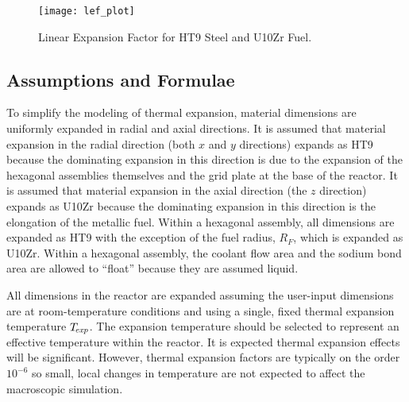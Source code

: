     \begin{figure}
      \centering
      \texttt{[image: lef\_plot]}
      \caption{Linear Expansion Factor for HT9 Steel and U10Zr Fuel.}
      \label{fig:lef_plot}
    \end{figure}
    
  \subsection{Assumptions and Formulae}
  \label{sec:model_details__assumptions_and_formulae}
    To simplify the modeling of thermal expansion, material dimensions are
    uniformly expanded in radial and axial directions. It is assumed that 
    material expansion in the radial direction (both $x$ and $y$ directions) 
    expands as HT9 because the dominating expansion in this direction is due to 
    the expansion of the hexagonal assemblies themselves and the grid plate at
    the base of the reactor. It is assumed that
    material expansion in the axial direction (the $z$ direction) expands as 
    U10Zr because the dominating expansion in this direction is the elongation 
    of the metallic fuel. Within a hexagonal assembly, all dimensions are 
    expanded as HT9 with the exception of the fuel radius, $R_F$, which is 
    expanded as U10Zr. Within a hexagonal assembly, the coolant flow area and 
    the sodium bond area are allowed to ``float'' because they are assumed 
    liquid.
    
    All dimensions in the reactor are expanded assuming the user-input 
    dimensions are at room-temperature conditions and using a single, fixed 
    thermal expansion temperature $T_{\!\mbox{\scriptsize \em exp}}$. The expansion temperature should be 
    selected to represent an effective temperature within the reactor. It is 
    expected thermal expansion effects will be significant. However, thermal 
    expansion factors are typically on the order $10^{-6}$ so small, local 
    changes in temperature are not expected to affect the macroscopic 
    simulation.

